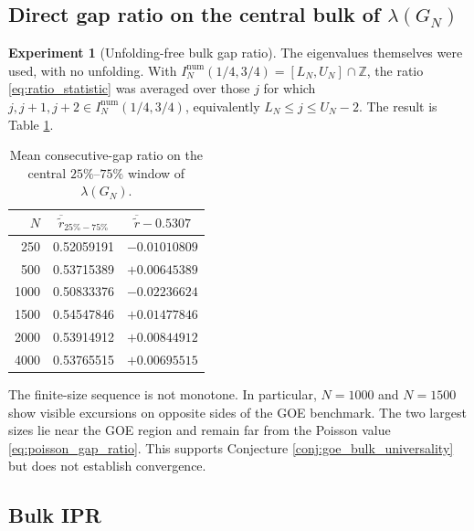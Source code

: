 \documentclass[11pt]{amsart}
\numberwithin{equation}{section}
\theoremstyle{plain}
\theoremstyle{definition}
\newtheorem{experiment}[theorem]{Experiment}
\theoremstyle{remark}
\begin{document}
\subsection{Direct gap ratio on the central bulk of $\lambda(G_N)$}
\label{subsec:direct_bulk_ratio}

\begin{experiment}[Unfolding-free bulk gap ratio]
\label{exp:bulk_gap_ratio}
The eigenvalues themselves were used, with no unfolding.  With $I_N^{\mathrm{num}}(1/4,3/4)=[L_N,U_N]\cap\mathbb Z$, the ratio \eqref{eq:ratio_statistic} was averaged over those $j$ for which $j,j+1,j+2\in I_N^{\mathrm{num}}(1/4,3/4)$, equivalently $L_N\le j\le U_N-2$.  The result is Table \ref{tab:bulk_ratio}.

\begin{table}[htbp]
\centering
\caption{Mean consecutive-gap ratio on the central $25\%$--$75\%$ window of $\lambda(G_N)$.}
\label{tab:bulk_ratio}
\begin{tabular}{rcc}
\toprule
$N$ & $\overline{\widetilde r}_{25\%-75\%}$ & $\overline{\widetilde r}-0.5307$\\
\midrule
250  & 0.52059191 & $-0.01010809$\\
500  & 0.53715389 & $+0.00645389$\\
1000 & 0.50833376 & $-0.02236624$\\
1500 & 0.54547846 & $+0.01477846$\\
2000 & 0.53914912 & $+0.00844912$\\
4000 & 0.53765515 & $+0.00695515$\\
\bottomrule
\end{tabular}
\end{table}

The finite-size sequence is not monotone.  In particular, $N=1000$ and $N=1500$ show visible excursions on opposite sides of the GOE benchmark.  The two largest sizes lie near the GOE region and remain far from the Poisson value \eqref{eq:poisson_gap_ratio}.  This supports Conjecture \ref{conj:goe_bulk_universality} but does not establish convergence.
\end{experiment}

\subsection{Bulk IPR}
\label{subsec:bulk_ipr_data}
\end{document}
